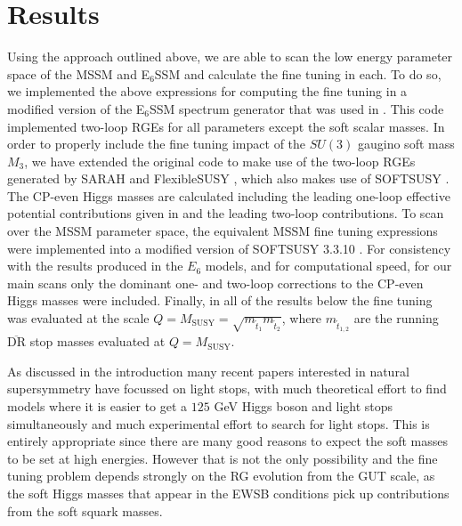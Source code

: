 \documentclass[preprint,amsmath,amssymb,aps,superscriptaddress,prd,showpacs,floatfix,nofootinbib]{revtex4-1}
\begin{document}
\section{\label{sec:results}Results}

Using the approach outlined above, we are able to scan the low energy
parameter space of the MSSM and E$_6$SSM and calculate the fine tuning
in each. To do so, we implemented the above expressions for computing
the fine tuning in a modified version of the E$_6$SSM spectrum
generator that was used in \cite{Athron:2013ipa}. This code
implemented two-loop RGEs for all parameters except the soft scalar
masses. In order to properly include the fine tuning impact of the
$SU(3)$ gaugino soft mass $M_3$, we have extended the original code to
make use of the two-loop RGEs generated by SARAH
\cite{Staub:2009bi,Staub:2010jh,Staub:2012pb,Staub:2013tta} and
FlexibleSUSY \cite{Athron:2014yba}, which also makes use of SOFTSUSY \cite{Allanach:2001kg,Allanach:2013kza}. The CP-even Higgs masses are
calculated including the leading one-loop effective potential
contributions given in \cite{Athron:2009bs} and the leading two-loop
contributions. To scan over the MSSM parameter space, the equivalent
MSSM fine tuning expressions were implemented into a modified version
of SOFTSUSY 3.3.10 \cite{Allanach:2001kg}. For
consistency with the results produced in the $E_6$ models, and for
computational speed, for our main scans only the dominant one- and
two-loop corrections to the CP-even Higgs masses were
included. Finally, in all of the results below the fine tuning was
evaluated at the scale
$Q=M_{\textrm{SUSY}}=\sqrt{m_{\tilde{t}_1}m_{\tilde{t}_2}}$, where
$m_{\tilde{t}_{1,2}}$ are the running $\overline{\textrm{DR}}$ stop
masses evaluated at $Q=M_{\textrm{SUSY}}$.


As discussed in the introduction many recent papers interested in
natural supersymmetry have focussed on light stops, with much
theoretical effort to find models where it is easier to get a $125$
GeV Higgs boson and light stops simultaneously and much experimental
effort to search for light stops.  This is entirely appropriate since
there are many good reasons to expect the soft masses to be set at
high energies.  However that is not the only possibility and the fine
tuning problem depends strongly on the RG evolution from the GUT
scale, as the soft Higgs masses that appear in the EWSB conditions
pick up contributions from the soft squark masses.
\end{document}

